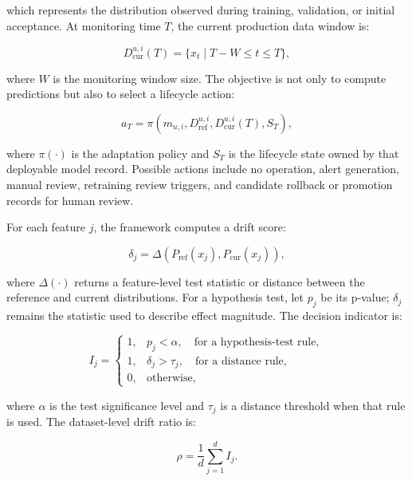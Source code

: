 \documentclass[runningheads]{llncs}
\begin{document}
which represents the distribution observed during training, validation, or initial acceptance. At monitoring time $T$, the current production data window is:

\begin{equation}
D_{\mathrm{cur}}^{u,i}(T)=\{x_t \mid T-W \leq t \leq T\},
\end{equation}

where $W$ is the monitoring window size. The objective is not only to compute predictions but also to select a lifecycle action:

\begin{equation}
a_T = \pi(m_{u,i},D_{\mathrm{ref}}^{u,i},D_{\mathrm{cur}}^{u,i}(T),S_T),
\end{equation}

where $\pi(\cdot)$ is the adaptation policy and $S_T$ is the lifecycle state owned by that deployable model record. Possible actions include no operation, alert generation, manual review, retraining review triggers, and candidate rollback or promotion records for human review.

For each feature $j$, the framework computes a drift score:

\begin{equation}
\delta_j=\Delta(P_{\mathrm{ref}}(x_j),P_{\mathrm{cur}}(x_j)),
\end{equation}

where $\Delta(\cdot)$ returns a feature-level test statistic or distance between the reference and current distributions. For a hypothesis test, let $p_j$ be its p-value; $\delta_j$ remains the statistic used to describe effect magnitude. The decision indicator is:

\begin{equation}
I_j =
\begin{cases}
1, & p_j < \alpha,\quad \text{for a hypothesis-test rule},\\
1, & \delta_j > \tau_j,\quad \text{for a distance rule},\\
0, & \mathrm{otherwise},
\end{cases}
\end{equation}

where $\alpha$ is the test significance level and $\tau_j$ is a distance threshold when that rule is used. The dataset-level drift ratio is:

\begin{equation}
\rho=\frac{1}{d}\sum_{j=1}^{d}I_j.
\end{equation}
\end{document}
